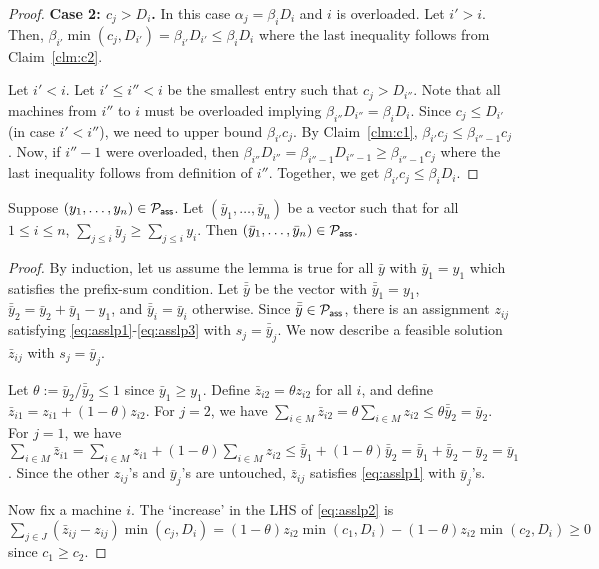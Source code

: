 \begin{proof}
\noindent
{\bf Case 2: $c_j > D_i$.} In this case $\alpha_j = \beta_iD_i$ and $i$ is overloaded. Let $i' > i$. Then, $\beta_{i'}\min(c_j,D_{i'}) = \beta_{i'}D_{i'} \leq \beta_iD_i$ where the last inequality follows from Claim~\ref{clm:c2}.


Let $i' < i$. Let $i'\leq i'' < i$ be the smallest entry such that $c_j > D_{i''}$. Note that all machines from $i''$ to $i$ must be overloaded implying $\beta_{i''}D_{i''} = \beta_iD_i$.
Since $c_j \leq D_{i'}$ (in case $i' < i''$), we need to upper bound $\beta_{i'}c_j$. 
By Claim~\ref{clm:c1}, $\beta_{i'}c_j \leq \beta_{i''-1}c_j$. Now, if $i''-1$ were overloaded, 
then $\beta_{i''}D_{i''} = \beta_{i''-1}D_{i''-1} \geq \beta_{i''-1}c_j$ where the last inequality follows from definition of $i''$. Together, we get $\beta_{i'}c_j \leq \beta_iD_i$.
\end{proof}
\def\y{\bar{y}}
\def\z{\bar{z}}
\def\yy{\bar{\bar{y}}}

\begin{lemma}
Suppose $(y_1,\ldots,y_n)\in {\cal P}_\mathsf{ass}$. Let $(\y_1,\ldots,\y_n)$ be a vector such that for all $1\leq i\leq n$, $\sum_{j\leq i} \y_j \geq \sum_{j\leq i} y_i$. Then
$(\y_1,\ldots,\y_n)\in \calP_{\mathsf{ass}}$.
\end{lemma}
\begin{proof}
By induction, let us assume the lemma is true for all $\y$ with $\y_1 = y_1$ which satisfies the prefix-sum condition.
Let $\yy$ be the vector with $\yy_1 = y_1$, $\yy_2 = \y_2 + \y_1 - y_1$, and $\yy_i = \y_i$ otherwise.
Since $\yy\in \calP_\mathsf{ass}$, there is an assignment $z_{ij}$ satisfying \eqref{eq:asslp1}-\eqref{eq:asslp3} with $s_j = \yy_j$.
We now describe a feasible solution $\z_{ij}$ with $s_j = \y_j$.

Let $\theta := \y_2/\yy_2 \le 1$ since $\y_1 \geq y_1$. Define $\z_{i2} = \theta z_{i2}$ for all $i$, and define $\z_{i1} = z_{i1} + (1-\theta)z_{i2}$.
For $j=2$, we have $\sum_{i\in M} \z_{i2} = \theta \sum_{i\in M} z_{i2} \leq \theta \yy_2 = \y_2$.
For $j=1$, we have $\sum_{i\in M} \z_{i1} = \sum_{i\in M} z_{i1} + (1-\theta) \sum_{i\in M} z_{i2} \leq \yy_1 + (1-\theta)\yy_2 = \yy_1 +\yy_2 - \y_2 = \y_1$. 
Since the other $z_{ij}$'s and $\y_j$'s are untouched, $\z_{ij}$ satisfies \eqref{eq:asslp1} with $\y_j$'s.

Now fix a machine $i$. The `increase' in the LHS of \eqref{eq:asslp2} is  $\sum_{j\in J} (\z_{ij} - z_{ij}) \min(c_j,D_i) = (1-\theta)z_{i2}\min(c_1,D_i) -  (1-\theta) z_{i2}\min(c_2,D_i) \geq 0$ since $c_1 \geq c_2$.

\end{proof}

